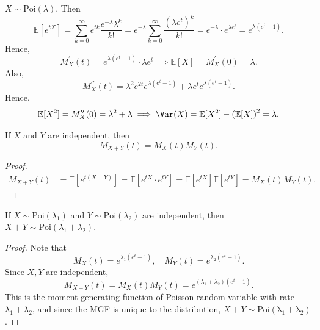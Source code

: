 \begin{eg}
    \(X \sim \mathrm{Poi}(\lambda ) \). Then 
    \[
        \mathbb{E} [e^{tX}] = \sum_{k=0}^{\infty} e^{tk} \frac{e^{-\lambda } \lambda ^k}{k!} = e^{-\lambda } \sum_{k=0}^{\infty} \frac{(\lambda e^t)^k}{k!} = e^{-\lambda } \cdot e^{\lambda e^t} = e^{\lambda (e^t - 1)}.  
    \] 
    Hence,
    \[
        M_X ^{\prime} (t) = e^{\lambda (e^t - 1)} \cdot \lambda e^t \implies \mathbb{E} [X] = M_X^{\prime} (0) = \lambda.
    \]
    Also,
    \[
        M_X^{\prime\prime} (t) = \lambda ^2 e^{2 t} e^{\lambda (e^t - 1)} + \lambda e^t e^{\lambda (e^t - 1)}.
    \]
    Hence,
    \[
        \mathbb{E} [X^2] = M_X^{\prime\prime} (0) = \lambda ^2 + \lambda \implies \Var(X) = \mathbb{E} [X^2] - \left( \mathbb{E} [X] \right)^2 = \lambda . 
    \]
\end{eg}

\begin{proposition}
    If \(X\) and \(Y\) are independent, then 
    \[
        M_{X + Y}(t) = M_X(t) M_Y(t).
    \]  
\end{proposition}

\begin{proof}
    \begin{align*}
        M_{X + Y}(t) &= \mathbb{E} [e^{t(X + Y)}] = \mathbb{E} [e^{tX} \cdot e^{tY}] = \mathbb{E} [e^{tX}] \mathbb{E} [e^{tY}] = M_X(t) M_Y(t).
    \end{align*}
\end{proof}

\begin{corollary}
    If \(X \sim \mathrm{Poi}(\lambda _1) \) and \(Y \sim \mathrm{Poi}(\lambda _2) \) are independent, then \(X + Y \sim \mathrm{Poi}(\lambda _1 + \lambda _2) \).   
\end{corollary}

\begin{proof}
    Note that 
    \[
        M_X(t) = e^{\lambda _1 (e^t - 1)}, \quad M_Y(t) = e^{\lambda _2 (e^t - 1)}.
    \]
    Since \(X, Y\) are independent,
    \[
        M_{X + Y}(t) = M_X(t) M_Y(t) = e^{(\lambda _1 + \lambda _2) (e^t - 1)}.
    \] 
    This is the moment generating function of Poisson random variable with rate \(\lambda _1 + \lambda _2\), and since the MGF is unique to the distribution, \(X + Y \sim \mathrm{Poi(\lambda _1 + \lambda _2)} \).  
\end{proof}

